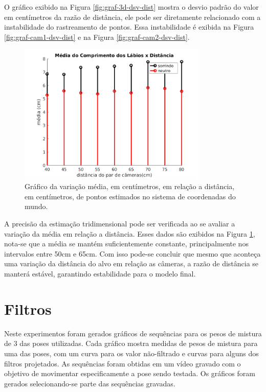 O gráfico exibido na Figura \ref{fig:graf-3d-dsv-dist} mostra o desvio padrão do valor em centímetros da razão de distância, ele pode ser diretamente relacionado com a instabilidade do rastreamento de pontos. Essa instabilidade é exibida na Figura \ref{fig:graf-cam1-dsv-dist} e na Figura \ref{fig:graf-cam2-dsv-dist}. 

\begin{figure}[!htpb]
\centering
\includegraphics[width=0.8\textwidth]{figs/media3d.png} 
\caption{Gráfico da variação média, em centímetros, em relação a distância, em centímetros, de pontos estimados no sistema de coordenadas do mundo.}
\label{fig:graf-3d-media-dist}
\end{figure}

A precisão da estimação tridimensional pode ser verificada ao se avaliar a variação da média em relação a distância. Esses dados são exibidos na Figura \ref{fig:graf-3d-media-dist}, nota-se que a média se mantém suficientemente constante, principalmente nos intervalos entre 50cm e 65cm. Com isso pode-se concluir que mesmo que aconteça uma variação da distância do alvo em relação as câmeras, a razão de distância se manterá estável, garantindo estabilidade para o modelo final.

\section{Filtros}

Neste experimentos foram gerados gráficos de sequências para os pesos de mistura de 3 das poses utilizadas. Cada gráfico mostra medidas de pesos de mistura para uma das poses, com um curva para os valor não-filtrado e curvas para alguns dos filtros projetados.  As sequências foram obtidas em um vídeo gravado com o objetivo de movimentar especificamente a pose sendo testada. Os gráficos foram gerados selecionando-se parte das sequências gravadas.

